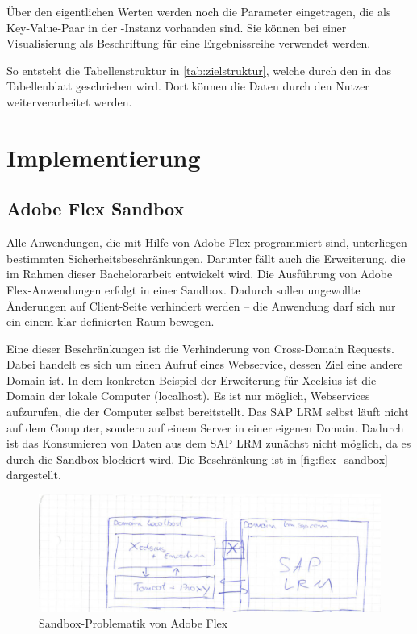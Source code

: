 \begin{onehalfspacing}
Über den eigentlichen Werten werden noch die Parameter eingetragen, die als Key-Value-Paar in der -Instanz vorhanden sind. Sie können bei einer Visualisierung als Beschriftung für eine Ergebnissreihe verwendet werden.

So entsteht die Tabellenstruktur in \vref{tab:zielstruktur}, welche durch den  in das Tabellenblatt geschrieben wird. Dort können die Daten durch den Nutzer weiterverarbeitet werden.

\section{Implementierung}
\subsection{Adobe Flex Sandbox}
Alle Anwendungen, die mit Hilfe von Adobe Flex programmiert sind, unterliegen bestimmten Sicherheitsbeschränkungen. Darunter fällt auch die Erweiterung, die im Rahmen dieser Bachelorarbeit entwickelt wird. Die Ausführung von Adobe Flex-Anwendungen erfolgt in einer Sandbox. Dadurch sollen ungewollte Änderungen auf Client-Seite verhindert werden -- die Anwendung darf sich nur ein einem klar definierten Raum bewegen.


Eine dieser Beschränkungen ist die Verhinderung von Cross-Domain Requests. Dabei handelt es sich um einen Aufruf eines Webservice, dessen Ziel eine andere Domain ist. In dem konkreten Beispiel der Erweiterung für \gls{Xcelsius} ist die Domain der lokale Computer (localhost). Es ist nur möglich, Webservices aufzurufen, die der Computer selbst bereitstellt. Das SAP LRM selbst läuft nicht auf dem Computer, sondern auf einem Server in einer eigenen Domain. Dadurch ist das Konsumieren von Daten aus dem SAP LRM zunächst nicht möglich, da es durch die Sandbox blockiert wird. Die Beschränkung ist in \vref{fig:flex_sandbox} dargestellt.

\begin{figure}[h]
\centering
\setlength{\unitlength}{1mm}
\includegraphics[width=15cm]{images/flex_sandbox.png}
\caption{Sandbox-Problematik von Adobe Flex\label{fig:flex_sandbox}}
\end{figure} 


\end{onehalfspacing}
